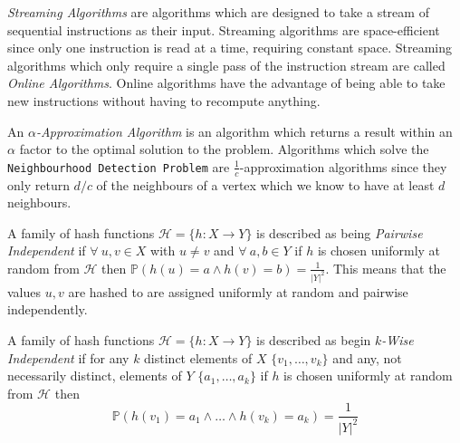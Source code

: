 \documentclass[11pt,twoside,a4paper]{report}
\begin{document}
\par \textit{Streaming Algorithms} are algorithms which are designed to take a stream of sequential instructions as their input. Streaming algorithms are space-efficient since only one instruction is read at a time, requiring constant space. Streaming algorithms which only require a single pass of the instruction stream are called \textit{Online Algorithms}. Online algorithms have the advantage of being able to take new instructions without having to recompute anything.

\par An \textit{$\alpha$-Approximation Algorithm} is an algorithm which returns a result within an $\alpha$ factor to the optimal solution to the problem. Algorithms which solve the \texttt{Neighbourhood Detection Problem} are $\frac1c$-approximation algorithms since they only return $d/c$ of the neighbours of a vertex which we know to have at least $d$ neighbours.

\par A family of hash functions $\mathcal{H}=\{h:X\to Y\}$ is described as being \textit{Pairwise Independent} if $\forall\ u,v\in X$ with $u\neq v$ and $\forall\ a,b\in Y$ if $h$ is chosen uniformly at random from $\mathcal{H}$ then $\mathbb{P}(h(u)=a\wedge h(v)=b)=\frac1{|Y|^2}$. This means that the values $u,v$ are hashed to are assigned uniformly at random and pairwise independently.

\par A family of hash functions $\mathcal{H}=\{h:X\to Y\}$ is described as begin \textit{$k$-Wise Independent} if for any $k$ distinct elements of $X$ $\{v_1,\dots,v_k\}$ and any, not necessarily distinct, elements of $Y$ $\{a_1,\dots,a_k\}$ if $h$ is chosen uniformly at random from $\mathcal{H}$ then $$\mathbb{P}(h(v_1)=a_1\wedge\dots\wedge h(v_k)=a_k)=\frac1{|Y|^2}$$
\end{document}
